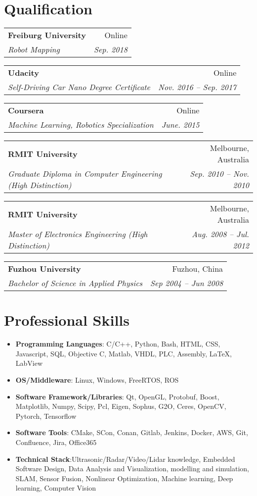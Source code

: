\documentclass[letterpaper,11pt]{article}
\makeatletter
\newcommand{\resumeItemNoBullet}[4]{
  \vspace{-1pt}
    \begin{tabular*}{0.97\textwidth}{l@{\extracolsep{\fill}}r}
      \textbf{#1} & #2 \\
      \textit{\small#3} & \textit{\small #4} \\
    \end{tabular*}\vspace{-7pt}
}
\newcommand{\resumeSubHeadingListStart}{\begin{itemize}[leftmargin=*]}
\newcommand{\resumeSubHeadingListEnd}{\end{itemize}}
\makeatother
\begin{document}
\section{Qualification}
\resumeItemNoBullet
    {Freiburg University}{Online}
    {Robot Mapping}{Sep. 2018}
\vspace{10pt}
\resumeItemNoBullet
    {Udacity}{Online}
    {Self-Driving Car Nano Degree Certificate}{Nov. 2016 -- Sep. 2017}
\vspace{10pt}
\resumeItemNoBullet
    {Coursera}{Online}
    {Machine Learning, Robotics Specialization}{June. 2015}
\vspace{10pt}
\resumeItemNoBullet
    {RMIT University}{Melbourne, Australia}
    {Graduate Diploma in Computer Engineering (High Distinction)}{Sep. 2010 -- Nov. 2010}
\vspace{10pt}
\resumeItemNoBullet
    {RMIT University}{Melbourne, Australia}
    {Master of Electronics Engineering (High Distinction)}{Aug. 2008 -- Jul. 2012}
\vspace{10pt}
\resumeItemNoBullet
    {Fuzhou University}{Fuzhou, China}
    {Bachelor of Science in Applied Physics}{Sep 2004 -- Jun 2008}

\section{Professional Skills}
  \resumeSubHeadingListStart
    \item{
      \textbf{Programming Languages}{: C/C++, Python, Bash, HTML, CSS, Javascript, SQL, Objective C, Matlab, VHDL, PLC, Assembly, \LaTeX, LabView}
	}
    \item{
      \textbf{OS/Middleware}{: Linux, Windows, FreeRTOS, ROS}
  }

    \item{
      \textbf{Software Framework/Libraries}{: Qt, OpenGL, Protobuf, Boost, Matplotlib, Numpy, Scipy, Pcl, Eigen, Sophus, G2O, Ceres, OpenCV, Pytorch, Tensorflow}
  }
    \item{
      \textbf{Software Tools}{: CMake, SCon, Conan, Gitlab, Jenkins, Docker, AWS, Git, Confluence, Jira, Office365}
  }

  \item{
      \textbf{Technical Stack}{:Ultrasonic/Radar/Video/Lidar knowledge, Embedded Software Design, Data Analysis and Visualization, modelling and simulation, SLAM, Sensor Fusion, Nonlinear Optimization, Machine learning, Deep learning, Computer Vision}
  }

  \resumeSubHeadingListEnd

\end{document}
